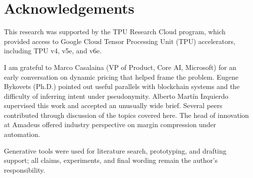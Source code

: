 \section*{Acknowledgements}

This research was supported by the TPU Research Cloud program, which provided access to Google Cloud Tensor Processing Unit (TPU) accelerators, including TPU v4, v5e, and v6e.

I am grateful to Marco Casalaina (VP of Product, Core AI, Microsoft) for an early conversation on dynamic pricing that helped frame the problem. Eugene Bykovets (Ph.D.) pointed out useful parallels with blockchain systems and the difficulty of inferring intent under pseudonymity. Alberto Mart\'{i}n Izquierdo supervised this work and accepted an unusually wide brief. Several peers contributed through discussion of the topics covered here. The head of innovation at Amadeus offered industry perspective on margin compression under automation.

Generative tools were used for literature search, prototyping, and drafting support; all claims, experiments, and final wording remain the author's responsibility.
